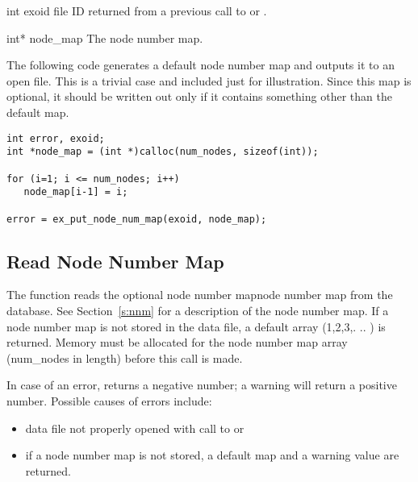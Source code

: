 
\begin{parameters}
\item[{int exoid \R{}}]
\exo{} file ID returned from a previous call to 
or .

\item[{int* node_map \R{}}]
The node number map.
\end{parameters}

The following code generates a default node number map and outputs it
to an open \exo{} file. This is a trivial case and included just for
illustration. Since this map is optional, it should be written out
only if it contains something other than the default map.

\begin{lstlisting}
int error, exoid;
int *node_map = (int *)calloc(num_nodes, sizeof(int));

for (i=1; i <= num_nodes; i++)
   node_map[i-1] = i;

error = ex_put_node_num_map(exoid, node_map);
\end{lstlisting}

\subsection{Read Node Number Map}

The function  reads the optional node
number mapnode number map from the database. See Section~\ref{s:nnm} for a
description of the node number map. If a node number map is
not stored in the data file, a default array (1,2,3,. .. )
is returned. Memory must be allocated for the node number map array
({num_nodes} in length) before this call is made.

In case of an error,  returns a
negative number; a warning will return a positive number. Possible
causes of errors include:

\begin{itemize}
 \item data file not properly opened with call to 
 or 

 \item if a node number map is not stored, a default map
and a warning value are returned.
\end{itemize}



